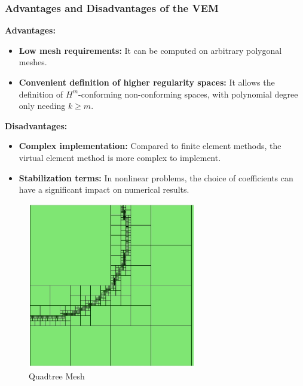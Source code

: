 \documentclass[notheorems,serif]{beamer}
\begin{document}
\begin{CJK}{UTF8}{gkai}
\begin{frame}
    \frametitle{Advantages and Disadvantages of the VEM}
\small{
\begin{minipage}[b]{0.6\linewidth}
\textbf{Advantages:}
\begin{itemize}
    \item \textbf{Low mesh requirements:} It can be computed on arbitrary polygonal meshes.
    \item \textbf{Convenient definition of higher regularity spaces:} It allows the definition of $H^m$-conforming non-conforming spaces, with polynomial degree only needing $k \geq m$.
\end{itemize}
\vspace{10pt}
\textbf{Disadvantages:}
\begin{itemize}
    \item \textbf{Complex implementation:} Compared to finite element methods, the virtual element method is more complex to implement.
    \item \textbf{Stabilization terms:} In nonlinear problems, the choice of coefficients can have a significant impact on numerical results.
\end{itemize}
\end{minipage}
\hfill
\begin{minipage}[b]{0.38\linewidth}
    \centering
    \begin{figure}[htpb]
        \centering
        \includegraphics[width=0.65\textwidth]{../figures/four.jpg}
        \caption{Quadtree Mesh}
    \end{figure}
    \vspace{20pt}
\end{minipage}
}
\end{frame}


\end{CJK}
\end{document}

